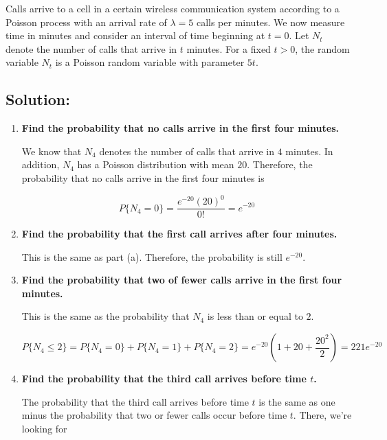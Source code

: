 \documentclass{article}
\begin{document}
Calls arrive to a cell in a certain wireless communication system according to a Poisson process with an arrival rate of $\lambda = 5$ calls per minutes. We now measure time in minutes and consider an interval of time beginning at $t = 0$. Let $N_t$ denote the number of calls that arrive in $t$ minutes. For a fixed $t > 0$, the random variable $N_t$ is a Poisson random variable with parameter $5t$.

\subsection{Solution:}

\begin{enumerate}[label=(\alph*)]
    \item \textbf{Find the probability that no calls arrive in the first four minutes.}

    We know that $N_4$ denotes the number of calls that arrive in $4$ minutes. In addition, $N_4$ has a Poisson distribution with mean $20$. Therefore, the probability that no calls arrive in the first four minutes is

    $$P\{N_4 = 0\} = \frac{e^{-20}(20)^0}{0!} = \boxed{e^{-20}}$$

    \vspace{2cm}
    
    \item \textbf{Find the probability that the first call arrives after four minutes.}

    This is the same as part (a). Therefore, the probability is still $\boxed{e^{-20}}$.

    \vspace{2cm}
    
    \item \textbf{Find the probability that two of fewer calls arrive in the first four minutes.}

    This is the same as the probability that $N_4$ is less than or equal to $2$.

    $$P\{N_4 \leq 2\} = P\{N_4 = 0\} + P\{N_4 = 1\} + P\{N_4 = 2\} = e^{-20}\left(1 + 20 + \frac{20^2}{2}\right) = \boxed{221e^{-20}}$$

    \vspace{2cm}
    
    \item \textbf{Find the probability that the third call arrives before time $t$.}

    The probability that the third call arrives before time $t$ is the same as one minus the probability that two or fewer calls occur before time $t$. There, we're looking for 


\end{enumerate}
\end{document}
